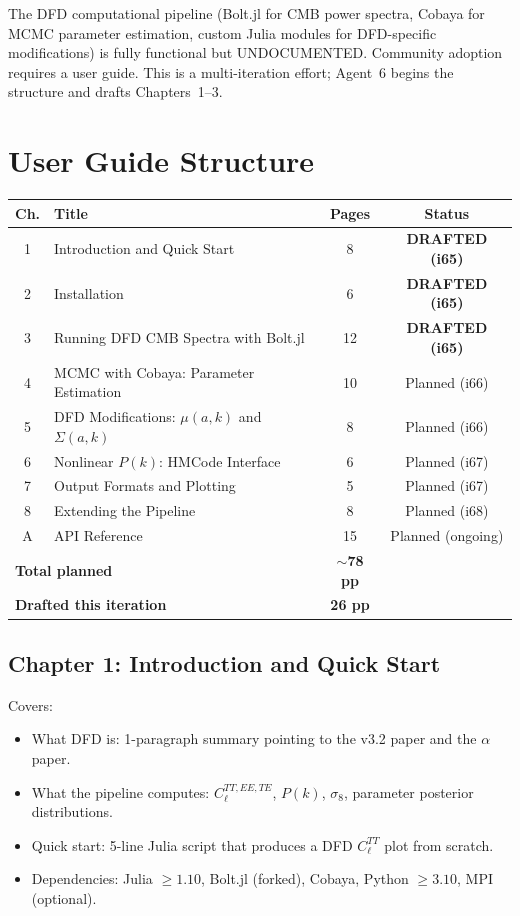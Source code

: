 \documentclass[11pt,a4paper]{article}
\begin{document}
The DFD computational pipeline (Bolt.jl for CMB power spectra, Cobaya for MCMC parameter estimation, custom Julia modules for DFD-specific modifications) is fully functional but UNDOCUMENTED. Community adoption requires a user guide. This is a multi-iteration effort; Agent~6 begins the structure and drafts Chapters~1--3.

\section{User Guide Structure}

\begin{center}
\begin{longtable}{clcc}
\toprule
\textbf{Ch.} & \textbf{Title} & \textbf{Pages} & \textbf{Status} \\
\midrule
1 & Introduction and Quick Start & 8 & \textbf{DRAFTED (i65)} \\
2 & Installation & 6 & \textbf{DRAFTED (i65)} \\
3 & Running DFD CMB Spectra with Bolt.jl & 12 & \textbf{DRAFTED (i65)} \\
4 & MCMC with Cobaya: Parameter Estimation & 10 & Planned (i66) \\
5 & DFD Modifications: $\mu(a,k)$ and $\Sigma(a,k)$ & 8 & Planned (i66) \\
6 & Nonlinear $P(k)$: HMCode Interface & 6 & Planned (i67) \\
7 & Output Formats and Plotting & 5 & Planned (i67) \\
8 & Extending the Pipeline & 8 & Planned (i68) \\
A & API Reference & 15 & Planned (ongoing) \\
\midrule
\multicolumn{2}{l}{\textbf{Total planned}} & \textbf{$\sim$78 pp} & \\
\multicolumn{2}{l}{\textbf{Drafted this iteration}} & \textbf{26 pp} & \\
\bottomrule
\end{longtable}
\end{center}

\subsection{Chapter 1: Introduction and Quick Start}

Covers:
\begin{itemize}
\item What DFD is: 1-paragraph summary pointing to the v3.2 paper and the $\alpha$ paper.
\item What the pipeline computes: $C_\ell^{TT,EE,TE}$, $P(k)$, $\sigma_8$, parameter posterior distributions.
\item Quick start: 5-line Julia script that produces a DFD $C_\ell^{TT}$ plot from scratch.
\item Dependencies: Julia $\geq 1.10$, Bolt.jl (forked), Cobaya, Python $\geq 3.10$, MPI (optional).
\end{itemize}
\end{document}
